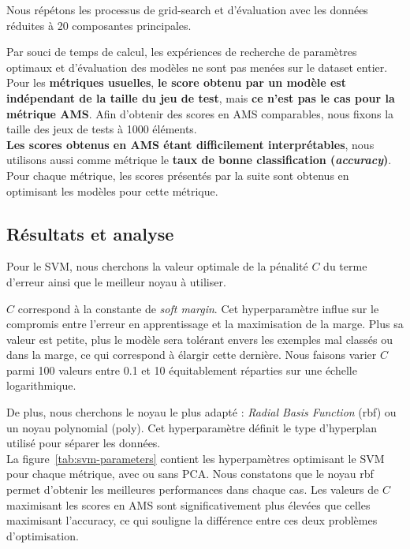 \documentclass[12pt]{article}
\newcommand{\figref}[1]{figure~\ref{#1}}
\begin{document}
\begin{mdframed}[hidealllines=true,backgroundcolor=blue!20] Nous répétons les
processus de grid-search et d'évaluation avec les données réduites à 20
composantes principales.  \\ \end{mdframed}

Par souci de temps de calcul, les expériences de recherche de paramètres
optimaux et d'évaluation des modèles ne sont pas menées sur le dataset entier.
Pour les \textbf{métriques usuelles}, \textbf{le score obtenu par un modèle est
indépendant de la taille du jeu de test}, mais \textbf{ce n'est pas le cas pour
la métrique AMS}.  Afin d'obtenir des scores en AMS comparables, nous fixons la
taille des jeux de tests à 1000 éléments. \\

\textbf{Les scores obtenus en AMS étant difficilement interprétables}, nous
utilisons aussi comme métrique le \textbf{taux de bonne classification
(\emph{accuracy})}. Pour chaque métrique, les scores présentés par la suite sont
obtenus en optimisant les modèles pour cette métrique.

\subsection{Résultats et analyse}

Pour le SVM, nous cherchons la valeur optimale de la pénalité $C$ du terme
d'erreur ainsi que le meilleur noyau à utiliser. 

$C$ correspond à la constante de \emph{soft margin}. Cet hyperparamètre influe
sur le compromis entre l'erreur en apprentissage et la maximisation de la marge.
Plus sa valeur est petite, plus le modèle sera tolérant envers les exemples mal
classés ou dans la marge, ce qui correspond à élargir cette dernière. Nous
faisons varier $C$ parmi 100 valeurs entre 0.1 et 10 équitablement réparties sur
une échelle logarithmique.

De plus, nous cherchons le noyau le plus adapté : \emph{Radial Basis Function}
(rbf) ou un noyau polynomial (poly). Cet hyperparamètre définit le type
d'hyperplan utilisé pour séparer les données.  \\

La \figref{tab:svm-parameters} contient les hyperpamètres optimisant le SVM pour
chaque métrique, avec ou sans PCA. Nous constatons que le noyau rbf permet
d'obtenir les meilleures performances dans chaque cas. Les valeurs de $C$
maximisant les scores en AMS sont significativement plus élevées que celles
maximisant l'accuracy, ce qui souligne la différence entre ces deux problèmes
d'optimisation.\\
\end{document}
